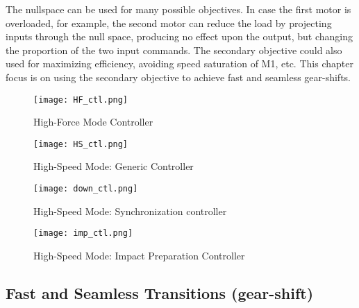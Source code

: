 The nullspace can be used for many possible objectives. In case the first motor is overloaded, for example, the second motor can reduce the load by projecting inputs through the null space, producing no effect upon the output, but changing the proportion of the two input commands. The secondary objective could also used for maximizing efficiency, avoiding speed saturation of M1, etc. This chapter focus is on using the secondary objective to achieve fast and seamless gear-shifts.



\begin{figure}[p]
	\centering
		\texttt{[image: HF\_ctl.png]}
	\caption{High-Force Mode Controller}
	\label{fig:HF_loop}
\end{figure}

\begin{figure}[p]
	\centering
		\texttt{[image: HS\_ctl.png]}
	\caption{High-Speed Mode: Generic Controller}
	\label{fig:HS_loop}
\end{figure}

\begin{figure}[p]
	\centering
		\texttt{[image: down\_ctl.png]}
	\caption{High-Speed Mode: Synchronization controller}
	\label{fig:down_loop}
\end{figure}

\begin{figure}[p]
	\centering
		\texttt{[image: imp\_ctl.png]}
	\caption{High-Speed Mode: Impact Preparation Controller}
	\label{fig:imp_loop}
\end{figure}



\subsection{Fast and Seamless Transitions (gear-shift)}
\label{sec:fastshifts}

